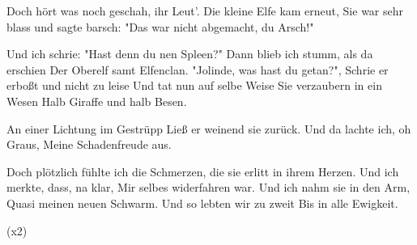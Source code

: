 \begin{guitar}
	Doch hört was noch geschah, ihr Leut'.
	Die kleine Elfe kam erneut,
	Sie war sehr blass und sagte barsch:
	"Das war nicht abgemacht, du Arsch!"
	
	Und ich schrie: "Hast denn du nen Spleen?"
	Dann blieb ich stumm, als da erschien
	Der Oberelf samt Elfenclan.
	"Jolinde, was hast du getan?",
	Schrie er erboßt und nicht zu leise
	Und tat nun auf selbe Weise
	Sie verzaubern in ein Wesen
	Halb Giraffe und halb Besen.
	
	 
	
	An einer Lichtung im Gestrüpp
	Ließ er weinend sie zurück.
	Und da lachte ich, oh Graus,
	Meine Schadenfreude aus.
	
	Doch plötzlich fühlte ich die Schmerzen,
	die sie erlitt in ihrem Herzen.
	Und ich merkte, dass, na klar,
	Mir selbes widerfahren war.
	Und ich nahm sie in den Arm,
	Quasi meinen neuen Schwarm.
	Und so lebten wir zu zweit
	Bis in alle Ewigkeit.
	
	  (x2)
	
\end{guitar}

